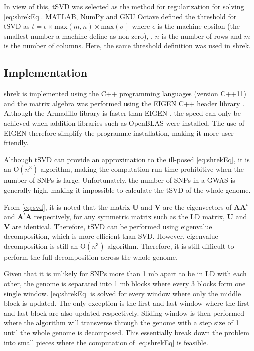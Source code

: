 \documentclass[12pt]{scrbook}
\begin{document}
In view of this, \gls{tSVD} was selected as the method for regularization for solving \cref{eq:shrekEq}. 
MATLAB, NumPy and GNU Octave defined the threshold for \gls{tSVD} as $t=\epsilon\times \mathrm{max}(m,n)\times \mathrm{max}(\sigma)$ where $\epsilon$ is the machine epsilon (the smallest number a machine define as non-zero), , $n$ is the number of rows and $m$ is the number of columns. 
Here, the same threshold definition was used in \gls{shrek}.

\subsection{Implementation}
\gls{shrek} is implemented using the C++ programming languages (version C++11) and the matrix algebra was performed using the EIGEN C++ header library \citep{eigenweb}.
Although the Armadillo library \citep{Sanderson2010} is faster than EIGEN \citep{Ho2011}, the speed can only be achieved when addition libraries such as OpenBLAS were installed. 
The use of EIGEN therefore simplify the programme installation, making it more user friendly. 

Although \gls{tSVD} can provide an approximation to the ill-posed \cref{eq:shrekEq}, it is an $\mathrm{O}(n^3)$ algorithm, making the computation run time prohibitive when the number of \glspl{SNP} is large.
Unfortunately, the number of \glspl{SNP} in a \gls{GWAS} is generally high, making it impossible to calculate the \gls{tSVD} of the whole genome. 

From \cref{eq:svd}, it is noted that the matrix $\boldsymbol{U}$ and $\boldsymbol{V}$ are the eigenvectors of $\boldsymbol{AA}^t$ and $\boldsymbol{A}^t\boldsymbol{A}$ respectively, for any symmetric matrix such as the \gls{LD} matrix, $\boldsymbol{U}$ and $\boldsymbol{V}$ are identical. 
Therefore, \gls{tSVD} can be performed using eigenvalue decomposition, which is more efficient than \gls{SVD}.
However, eigenvalue decomposition is still an $\mathrm{O}(n^3)$ algorithm.
Therefore, it is still difficult to perform the full decomposition across the whole genome.

Given that it is unlikely for \glspl{SNP} more than 1 \gls{mb} apart to be in \gls{LD} with each other, the genome is separated into 1 \gls{mb} blocks where every 3 blocks form one single window.
\cref{eq:shrekEq} is solved for every window where only the middle block is updated. 
The only exception is the first and last window where the first and last block are also updated respectively. 
Sliding window is then performed where the algorithm will transverse through the genome with a step size of 1 until the whole genome is decomposed.
This essentially break down the problem into small pieces where the computation of \cref{eq:shrekEq} is feasible.
\end{document}

